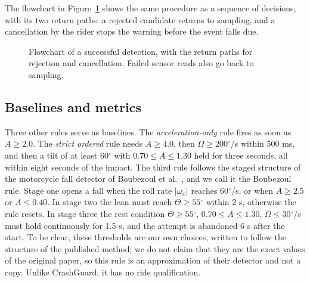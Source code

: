 \documentclass[10pt,a4paper]{article}
\newcommand{\degree}{\ensuremath{^{\circ}}}
\begin{document}
The flowchart in Figure~\ref{fig:flow} shows the same procedure as a sequence of decisions, with its two return paths: a rejected candidate returns to sampling, and a cancellation by the rider stops the warning before the event falls due.

\begin{figure}[H]\centering
{}\caption{Flowchart of a successful detection, with the return paths for rejection and cancellation. Failed sensor reads also go back to sampling.}\label{fig:flow}
\end{figure}

\subsection{Baselines and metrics}\label{sec:baselines}
Three other rules serve as baselines. The \emph{acceleration-only} rule fires as soon as $A\geq2.0$. The \emph{strict ordered} rule needs $A\geq4.0$, then $\Omega\geq200\degree$/s within 500 ms, and then a tilt of at least 60$\degree$ with $0.70\leq A\leq1.30$ held for three seconds, all within eight seconds of the impact. The third rule follows the staged structure of the motorcycle fall detector of Boubezoul et al.~\cite{boubezoul2013algorithm}, and we call it the Boubezoul rule. Stage one opens a fall when the roll rate $|\omega_x|$ reaches 60$\degree$/s, or when $A\geq2.5$ or $A\leq0.40$. In stage two the lean must reach $\Theta\geq55\degree$ within 2 s, otherwise the rule resets. In stage three the rest condition $\Theta\geq55\degree$, $0.70\leq A\leq1.30$, $\Omega\leq30\degree$/s must hold continuously for 1.5 s, and the attempt is abandoned 6 s after the start. To be clear, these thresholds are our own choices, written to follow the structure of the published method; we do not claim that they are the exact values of the original paper, so this rule is an approximation of their detector and not a copy. Unlike CrashGuard, it has no ride qualification.
\end{document}
